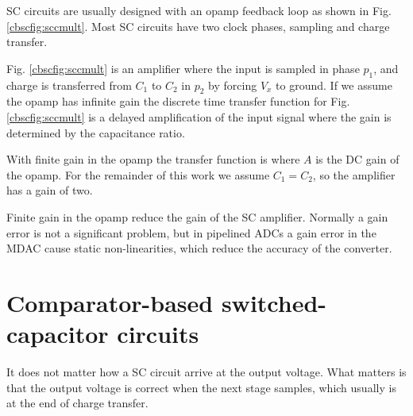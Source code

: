 SC circuits are usually designed with an opamp feedback loop as shown in
Fig. \ref{cbscfig:sccmult}. Most SC circuits have two clock phases,
sampling and charge transfer. 

Fig. \ref{cbscfig:sccmult} is an  
amplifier where the input is sampled in phase $p_1$, and charge is
transferred from
$C_1$ to $C_2$ in $p_2$ by forcing $V_x$ to
ground. If we assume the opamp has infinite gain the discrete time transfer
function for Fig. \ref{cbscfig:sccmult} is a  delayed
amplification of the input signal
 where the gain is determined by the capacitance
ratio. 

With finite gain in the opamp the transfer function is
where $A$ is the DC gain of the opamp.  For the remainder of this work we assume $C_1 = C_2$, so the
amplifier has a gain of two.

Finite gain in the
opamp reduce the gain of the SC amplifier.
Normally a gain error is not a significant problem, but in pipelined
ADCs a gain error in the MDAC cause static non-linearities, which 
reduce the accuracy of the converter.  





\section{Comparator-based switched-capacitor circuits}\label{cbsccbsc}
It does not matter how a SC circuit arrive at the output
voltage. What matters is that the output voltage is correct when the 
next stage samples, which usually is at the end of charge transfer. 

